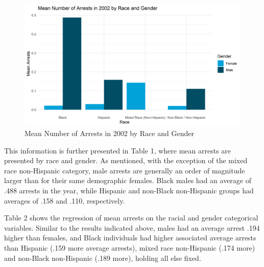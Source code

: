 \documentclass{article}
\begin{document}
\begin{figure}[H]
    \begin{center}
        \includegraphics[width=.85\textwidth]{arrests_by_racegender}
    \end{center}
    \caption{Mean Number of Arrests in 2002 by Race and Gender}
    \label{fig:graph}
\end{figure}

This information is further presented in Table 1, where mean arrests are presented by race and gender. As mentioned, with the exception of the mixed race non-Hispanic category, male arrests are generally an order of magnitude larger than for their same demographic females. Black males had an average of .488 arrests in the year, while Hispanic and non-Black non-Hispanic groups had averages of .158 and .110, respectively. 



Table 2 shows the regression of mean arrests on the racial and gender categorical variables. Similar to the results indicated above, males had an average arrest .194 higher than females, and Black individuals had higher associated average arrests than Hispanic (.159 more average arrests), mixed race non-Hispanic (.174 more) and non-Black non-Hispanic (.189 more), holding all else fixed. 
 

\end{document}

